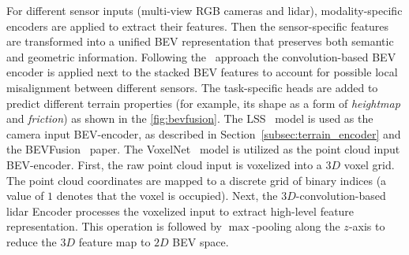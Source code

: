 For different sensor inputs (multi-view RGB cameras and lidar),
modality-specific encoders are applied to extract their features.
Then the sensor-specific features are transformed into a unified BEV representation
that preserves both semantic and geometric information.
Following the~\cite{liu2023bevfusion} approach the convolution-based BEV encoder
is applied next to the stacked BEV features to account for possible local misalignment between different sensors.
The task-specific heads are added to predict different terrain properties
(for example, its shape as a form of \textit{heightmap} and \textit{friction})
as shown in the \autoref{fig:bevfusion}.
The LSS~\cite{philion2020lift} model is used as the camera input BEV-encoder,
as described in Section~\ref{subsec:terrain_encoder} and the BEVFusion~\cite{liu2023bevfusion} paper.
The VoxelNet~\cite{zhou2018voxelnet} model is utilized as the point cloud input BEV-encoder.
First, the raw point cloud input is voxelized into a $3D$ voxel grid.
The point cloud coordinates are mapped to a discrete grid of binary indices
(a value of $1$ denotes that the voxel is occupied).
Next, the $3D$-convolution-based lidar Encoder processes the voxelized input to extract
high-level feature representation.
This operation is followed by $\max$-pooling along the $z$-axis to reduce the $3D$ feature map to $2D$ BEV space.

